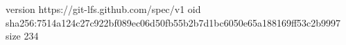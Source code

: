 version https://git-lfs.github.com/spec/v1
oid sha256:7514a124c27c922bf089ec06d50fb55b2b7d1bc6050e65a188169ff53c2b9997
size 234
